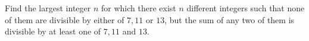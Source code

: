 Find the largest integer $n$ for which there exist $n$ different integers such that none of them are divisible by either of $7,11$ or $13$,  but the sum of any two of them is divisible by at least one of $7,11$ and $13$.